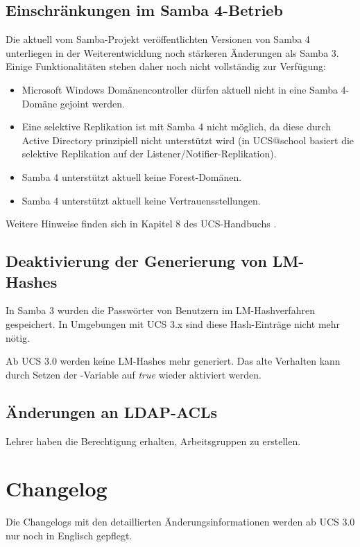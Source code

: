 \section{Einschränkungen im Samba 4-Betrieb}

Die aktuell vom Samba-Projekt veröffentlichten Versionen von Samba 4
unterliegen in der Weiterentwicklung noch stärkeren Änderungen als Samba
3. Einige Funktionalitäten stehen daher noch nicht vollständig zur Verfügung:

\begin{itemize}
\item Microsoft Windows Domänencontroller dürfen aktuell nicht in eine Samba 4-Domäne
gejoint werden.
\item Eine selektive Replikation ist mit Samba 4 nicht möglich, da diese durch
Active Directory prinzipiell nicht unterstützt wird (in UCS@school
basiert die selektive Replikation auf der Listener/Notifier-Replikation).
\item Samba 4 unterstützt aktuell keine Forest-Domänen. 
\item Samba 4 unterstützt aktuell keine Vertrauensstellungen.
\end{itemize}

Weitere Hinweise finden sich in Kapitel 8 des UCS-Handbuchs \cite{UCS-Handbuch}.

\section{Deaktivierung der Generierung von LM-Hashes}
In Samba 3 wurden die Passwörter von Benutzern im LM-Hashverfahren gespeichert.
In Umgebungen mit UCS 3.x sind diese Hash-Einträge nicht mehr nötig. 

Ab UCS 3.0 werden keine LM-Hashes mehr generiert. Das alte Verhalten kann durch
Setzen der \ucsUCR{}-Variable  auf \emph{true} wieder aktiviert 
werden.

\section{Änderungen an LDAP-ACLs}
Lehrer haben die Berechtigung erhalten, Arbeitsgruppen zu erstellen.


\chapter{Changelog}

Die Changelogs mit den detaillierten Änderungsinformationen werden ab UCS 3.0
nur noch in Englisch gepflegt.







